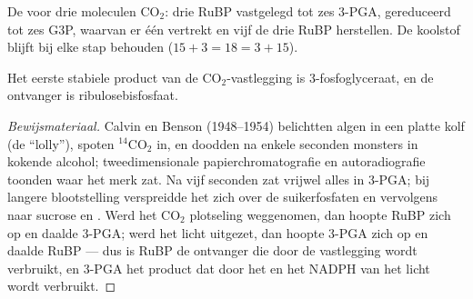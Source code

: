 \begin{omfigure}

{\small De  voor drie moleculen $\mathrm{CO_2}$: drie RuBP vastgelegd
tot zes 3-PGA, gereduceerd tot zes G3P, waarvan er één vertrekt en vijf de drie
RuBP herstellen. De koolstof blijft bij elke stap behouden
($15 + 3 = 18 = 3 + 15$).}
\end{omfigure}

\begin{proposition}\label{prop:b1:photosynthesis:calvin}
Het eerste stabiele product van de $\mathrm{CO_2}$-vastlegging is
3-fosfoglyceraat, en de ontvanger is ribulosebisfosfaat.
\end{proposition}
\begin{proof}[Bewijsmateriaal]
Calvin en Benson (1948--1954) belichtten algen in een platte kolf (de
``lolly''), spoten $\mathrm{^{14}CO_2}$ in, en doodden na enkele seconden monsters
in kokende alcohol; tweedimensionale papierchromatografie en autoradiografie
toonden waar het merk zat. Na vijf seconden zat vrijwel alles in 3-PGA; bij langere
blootstelling verspreidde het zich over de suikerfosfaten en vervolgens naar
sucrose en . Werd het $\mathrm{CO_2}$ plotseling weggenomen, dan hoopte RuBP
zich op en daalde 3-PGA; werd het licht uitgezet, dan hoopte 3-PGA zich op en
daalde RuBP --- dus is RuBP de ontvanger die door de vastlegging wordt verbruikt,
en 3-PGA het product dat door het  en het NADPH van het licht wordt verbruikt.
\end{proof}

